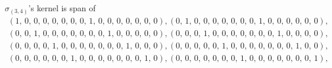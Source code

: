 \documentclass[8pt]{article}\usepackage{amsmath}
\begin{document}
\( \sigma_{(3, 4)}\)'s kernel is span of   
\begin{align*} \left(1,\,0,\,0,\,0,\,0,\,0,\,0,\,0,\,1,\,0,\,0,\,0,\,0,\,0,\,0,\,0\right) , \left(0,\,1,\,0,\,0,\,0,\,0,\,0,\,0,\,0,\,1,\,0,\,0,\,0,\,0,\,0,\,0\right) , \\ 
 \left(0,\,0,\,1,\,0,\,0,\,0,\,0,\,0,\,0,\,0,\,1,\,0,\,0,\,0,\,0,\,0\right) , \left(0,\,0,\,0,\,1,\,0,\,0,\,0,\,0,\,0,\,0,\,0,\,1,\,0,\,0,\,0,\,0\right) , \\ 
 \left(0,\,0,\,0,\,0,\,1,\,0,\,0,\,0,\,0,\,0,\,0,\,0,\,1,\,0,\,0,\,0\right) , \left(0,\,0,\,0,\,0,\,0,\,1,\,0,\,0,\,0,\,0,\,0,\,0,\,0,\,1,\,0,\,0\right) , \\ 
 \left(0,\,0,\,0,\,0,\,0,\,0,\,1,\,0,\,0,\,0,\,0,\,0,\,0,\,0,\,1,\,0\right) , \left(0,\,0,\,0,\,0,\,0,\,0,\,0,\,1,\,0,\,0,\,0,\,0,\,0,\,0,\,0,\,1\right) , \\ \end{align*}
\end{document}
